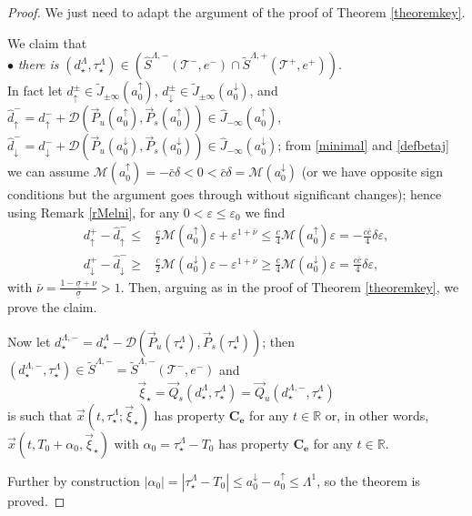 \documentclass[10pt,a4paper]{amsart}
\def\DDD{\mathscr{D}}
\def\MM{{\mathcal M}}
\def\P{\vec{P}}
\def\Q{\vec{Q}}
\def\R{{\mathbb R}}
\def\TT{{\mathcal T}}
\def\adown{a^{\downarrow}}
\def\aup{a^{\uparrow}}
\def\ee{{e}}
\def\ep{\varepsilon}
\def\l1{\Lambda^{1}}
\def\xxi{\vec{\xi}}
\def\x{\vec{x}}
\newcommand\bs[1]{{\boldsymbol{#1}}}
\begin{document}
\begin{proof}
  We just need to adapt the argument of the proof of Theorem \ref{theoremkey}.





  We claim that
\\ $\bullet$ \emph{there is}
$(d_{\star}^{\Lambda},\tau_{\star}^{\Lambda}) \in (\hat{S}^{\Lambda,-}(\TT^-, \ee^-) \cap  \tilde{S}^{\Lambda,+}(\TT^+, \ee^+))$.
\\
In fact let
$d^{\pm}_{\uparrow} \in \tilde{J}_{\pm\infty}(\aup_0)$, $d^{\pm}_{\downarrow} \in \tilde{J}_{\pm\infty}(\adown_0)$,
 and  $\hat{d}^-_{\uparrow}= d^-_{\uparrow}+ \DDD(\P_u(\aup_0), \P_s(\aup_0)) \in \hat{J}_{-\infty}(\aup_0)$,
 $\hat{d}^-_{\downarrow}= d^-_{\downarrow}+ \DDD(\P_u(\adown_0), \P_s(\adown_0)) \in \hat{J}_{-\infty}(\adown_0)$;
from \eqref{minimal} and \eqref{defbetaj} we can assume  $\MM(\aup_0)=-\bar{c} \delta<0<\bar{c} \delta =\MM(\adown_0)$
(or we have opposite sign conditions but the argument goes through without significant changes);
hence using Remark \ref{rMelni}, for any $0<\ep \le \ep_0$ we find
\begin{equation}\label{d+id-ibis}
  \begin{split}
     d^{+}_{\uparrow}-\hat{d}^{-}_{\uparrow} \le  &   \frac{c}{2} \MM(\aup_0) \ep +\ep^{1+\bar{\nu} } \le    \frac{c}{4} \MM(\aup_0) \ep =  -
     \frac{c\bar{c}}{4} \delta \ep , \\
     d^{+}_{\downarrow}-\hat{d}^{-}_{\downarrow}\ge  &  \frac{c}{2} \MM(\adown_0)\ep  -\ep^{1+\bar{\nu} } \ge   \frac{c}{4} \MM(\adown_0) \ep
     =
     \frac{c\bar{c}}{4}  \delta\ep ,
  \end{split}
\end{equation}
 with $\bar{\nu}= \frac{1-\underline{\sigma}+\nu}{\underline{\sigma}}>1$.
Then, arguing as in the proof of Theorem \ref{theoremkey}, we prove the claim.

Now let $d^{\Lambda,-}_\star=d_\star^{\Lambda}- \DDD(\P_u(\tau_\star^{\Lambda}), \P_s(\tau_\star^{\Lambda}))$; then
$(d^{\Lambda,-}_\star,\tau_\star^{\Lambda}) \in
\tilde{S}^{\Lambda,-}=\tilde{S}^{\Lambda,-}(\TT^-, \ee^-)$ and
$$\xxi_\star = \Q_s(d_\star^{\Lambda},\tau_\star^{\Lambda})= \Q_u(d^{\Lambda,-}_\star,\tau_\star^{\Lambda})$$
is such that $\x(t,\tau_\star^{\Lambda}; \xxi_\star)$ has property $\bs{C_{\ee}}$ for any $t \in \R$ or, in other words,
$\x(t,T_0+\alpha_0,\xxi_\star)$ with $\alpha_0=\tau_\star^{\Lambda}-T_0$ has property $\bs{C_{\ee}}$ for any $t \in \R$.

Further by construction   $ |\alpha_0| = |\tau_\star^{\Lambda}-T_0| \le \adown_0-\aup_0 \leq \l1$, so the theorem is proved.
\end{proof}
\end{document}
